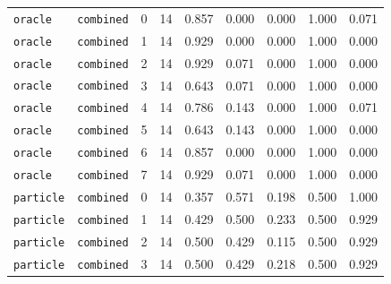 \documentclass{article}
\begin{document}
\begin{center}
\begin{tabular}{llccccccc}
\texttt{oracle} & \texttt{combined} & 0 & 14 & 0.857 & 0.000 & 0.000 & 1.000 & 0.071 \\
\texttt{oracle} & \texttt{combined} & 1 & 14 & 0.929 & 0.000 & 0.000 & 1.000 & 0.000 \\
\texttt{oracle} & \texttt{combined} & 2 & 14 & 0.929 & 0.071 & 0.000 & 1.000 & 0.000 \\
\texttt{oracle} & \texttt{combined} & 3 & 14 & 0.643 & 0.071 & 0.000 & 1.000 & 0.000 \\
\texttt{oracle} & \texttt{combined} & 4 & 14 & 0.786 & 0.143 & 0.000 & 1.000 & 0.071 \\
\texttt{oracle} & \texttt{combined} & 5 & 14 & 0.643 & 0.143 & 0.000 & 1.000 & 0.000 \\
\texttt{oracle} & \texttt{combined} & 6 & 14 & 0.857 & 0.000 & 0.000 & 1.000 & 0.000 \\
\texttt{oracle} & \texttt{combined} & 7 & 14 & 0.929 & 0.071 & 0.000 & 1.000 & 0.000 \\
\texttt{particle} & \texttt{combined} & 0 & 14 & 0.357 & 0.571 & 0.198 & 0.500 & 1.000 \\
\texttt{particle} & \texttt{combined} & 1 & 14 & 0.429 & 0.500 & 0.233 & 0.500 & 0.929 \\
\texttt{particle} & \texttt{combined} & 2 & 14 & 0.500 & 0.429 & 0.115 & 0.500 & 0.929 \\
\texttt{particle} & \texttt{combined} & 3 & 14 & 0.500 & 0.429 & 0.218 & 0.500 & 0.929 \\
\bottomrule
\end{tabular}
\end{center}
\end{document}
